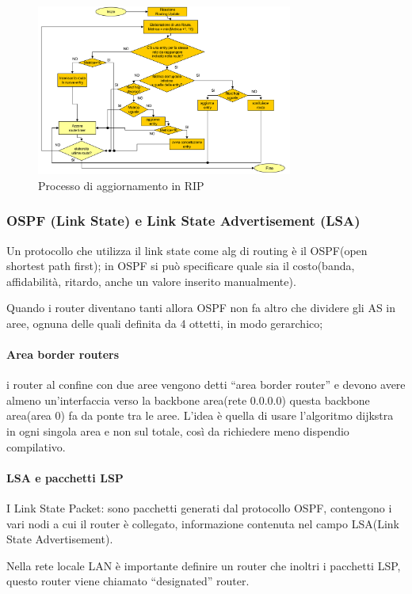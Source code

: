 \begin{figure}[h!]
    \centering
    \includegraphics[width=0.75\textwidth]{images/processoRIP.png}
    \caption{Processo di aggiornamento in RIP}
    \label{fig:processoRIP}
\end{figure}
\newpage
\subsubsection{OSPF (Link State) e Link State Advertisement (LSA)}

Un protocollo che utilizza il link state come alg di routing è il OSPF(open shortest path first);
in OSPF si può specificare quale sia il costo(banda, affidabilità, ritardo, anche un valore inserito manualmente).

Quando i router diventano tanti allora OSPF non fa altro che dividere gli AS in aree, ognuna delle quali definita da 4 ottetti, in modo gerarchico;
\paragraph{Area border routers}
i router al confine con due aree vengono detti “area border router” e devono avere almeno un'interfaccia verso la backbone area(rete 0.0.0.0)
questa backbone area(area 0) fa da ponte tra le aree.
L'idea è quella di usare l'algoritmo dijkstra in ogni singola area e non sul totale, così da richiedere meno dispendio compilativo.

\paragraph{LSA e pacchetti LSP}
I Link State Packet: sono pacchetti generati dal protocollo OSPF, contengono i vari nodi a cui il router è collegato, informazione contenuta nel campo LSA(Link State Advertisement).

Nella rete locale LAN è importante definire un router che inoltri i pacchetti LSP, questo router viene chiamato “designated” router.

